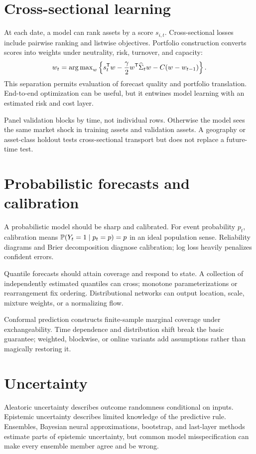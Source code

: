 \section{Cross-sectional learning}

At each date, a model can rank assets by a score $s_{i,t}$. Cross-sectional losses
include pairwise ranking and listwise objectives. Portfolio construction converts
scores into weights under neutrality, risk, turnover, and capacity:
\[
w_t=\operatorname{arg\,max}_w
\left\{
s_t^\mathsf T w-\frac{\gamma}{2}w^\mathsf T\widehat\Sigma_tw
-C(w-w_{t-1})
\right\}.
\]
This separation permits evaluation of forecast quality and portfolio translation.
End-to-end optimization can be useful, but it entwines model learning with an
estimated risk and cost layer.

Panel validation blocks by time, not individual rows. Otherwise the model sees the
same market shock in training assets and validation assets. A geography or asset-class
holdout tests cross-sectional transport but does not replace a future-time test.

\section{Probabilistic forecasts and calibration}

A probabilistic model should be sharp and calibrated. For event probability
$p_t$, calibration means
$\mathbb P(Y_t=1\mid p_t=p)=p$ in an ideal population sense. Reliability diagrams and
Brier decomposition diagnose calibration; log loss heavily penalizes confident
errors.

Quantile forecasts should attain coverage and respond to state. A collection of
independently estimated quantiles can cross; monotone parameterizations or
rearrangement fix ordering. Distributional networks can output location, scale,
mixture weights, or a normalizing flow.

Conformal prediction constructs finite-sample marginal coverage under exchangeability.
Time dependence and distribution shift break the basic guarantee; weighted,
blockwise, or online variants add assumptions rather than magically restoring it.

\section{Uncertainty}

Aleatoric uncertainty describes outcome randomness conditional on inputs. Epistemic
uncertainty describes limited knowledge of the predictive rule. Ensembles, Bayesian
neural approximations, bootstrap, and last-layer methods estimate parts of epistemic
uncertainty, but common model misspecification can make every ensemble member agree
and be wrong.


